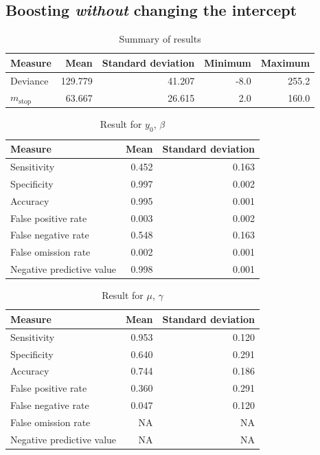 \subsection{Boosting \textit{without} changing the intercept}
\begin{table}\caption{Summary of results}
\begin{tabular}{l|rrrr}
Measure &    Mean &     Standard deviation &  Minimum & Maximum \\
\hline
Deviance & 129.779 & 41.207 & -8.0 & 255.2 \\
$m_{\text{stop}}$   &  63.667 & 26.615 &  2.0 & 160.0 \\
\end{tabular}
\end{table}

\begin{table}\caption{Result for $y_0$, $\beta$}
\begin{tabular}{l|rr}
Measure &  Mean &    Standard deviation \\
\hline
Sensitivity & 0.452 & 0.163 \\
Specificity & 0.997 & 0.002 \\
Accuracy    & 0.995 & 0.001 \\
False positive rate         & 0.003 & 0.002 \\
False negative rate         & 0.548 & 0.163 \\
False omission rate         & 0.002 & 0.001 \\
Negative predictive value         & 0.998 & 0.001
\end{tabular}
\end{table}


\begin{table}\caption{Result for $\mu$, $\gamma$}
\begin{tabular}{l|rr}
Measure &  Mean & Standard deviation \\
\hline
Sensitivity & 0.953 & 0.120 \\
Specificity & 0.640 & 0.291 \\
Accuracy    & 0.744 & 0.186 \\
False positive rate         & 0.360 & 0.291 \\
False negative rate         & 0.047 & 0.120 \\
False omission rate         &    NA &    NA \\
Negative predictive value         &    NA &    NA \\
\end{tabular}
\end{table}